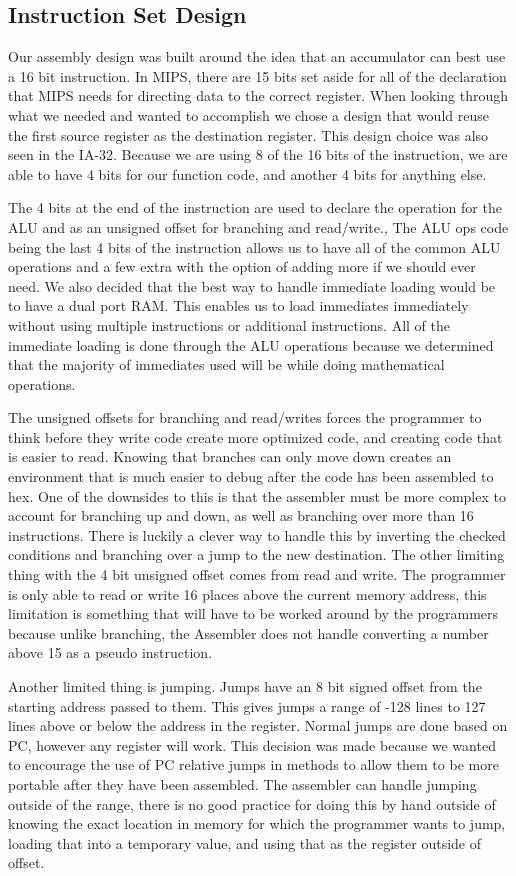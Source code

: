 \documentclass{report}
\begin{document}
		\subsection{Instruction Set Design}
			Our assembly design was built around the idea that an accumulator can best use a 16 bit instruction.  In MIPS, there are 15 bits set aside for all of the declaration that MIPS needs for directing data to the correct register. When looking through what we needed and wanted to accomplish we chose a design that would reuse the first source register as the destination register. This design choice was also seen in the IA-32. Because we are using 8 of the 16 bits of the instruction, we are able to have 4 bits for our function code, and another 4 bits for anything else.\par
			The 4 bits at the end of the instruction are used to declare the operation for the ALU and as an unsigned offset for branching and read/write., The ALU ops code being the last 4 bits of the instruction allows us to have all of the common ALU operations and a few extra with the option of adding more if we should ever need. We also decided that the best way to handle immediate loading would be to have a dual port RAM. This enables us to load immediates immediately without using multiple instructions or additional instructions. All of the immediate loading is done through the ALU operations because we determined that the majority of immediates used will be while doing mathematical operations.\par
			The unsigned offsets for branching and read/writes forces the programmer to think before they write code create more optimized code, and creating code that is easier to read. Knowing that branches can only move down creates an environment that is much easier to debug after the code has been assembled to hex. One of the downsides to this is that the assembler must be more complex to account for branching up and down, as well as branching over more than 16 instructions. There is luckily a clever way to handle this by inverting the checked conditions and branching over a jump to the new destination. The other limiting thing with the 4 bit unsigned offset comes from read and write. The programmer is only able to read or write 16 places above the current memory address, this limitation is something that will have to be worked around by the programmers because unlike branching, the Assembler does not handle converting a number above 15 as a pseudo instruction.\par
			Another limited thing is jumping. Jumps have an 8 bit signed offset from the starting address passed to them. This gives jumps a range of -128 lines to 127 lines above or below the address in the register. Normal jumps are done based on PC, however any register will work. This decision was made because we wanted to encourage the use of PC relative jumps in methods to allow them to be more portable after they have been assembled. The assembler can handle jumping outside of the range, there is no good practice for doing this by hand outside of knowing the exact location in memory for which the programmer wants to jump, loading that into a temporary value, and using that as the register outside of offset.\par
\end{document}
